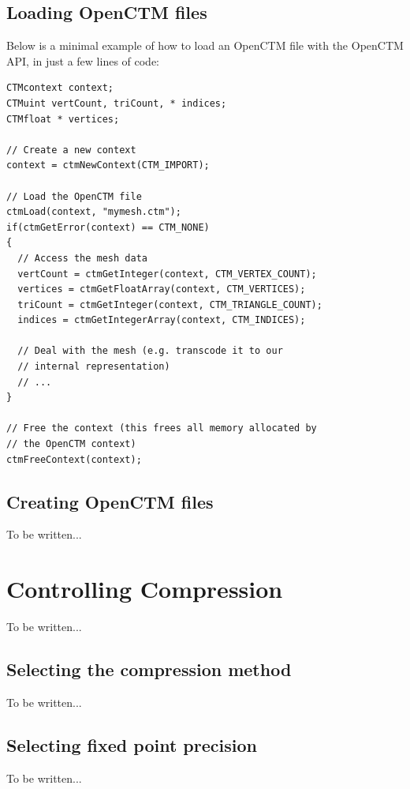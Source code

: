 \section{Loading OpenCTM files}
Below is a minimal example of how to load an OpenCTM file with the OpenCTM API,
in just a few lines of code:

\begin{lstlisting}
CTMcontext context;
CTMuint vertCount, triCount, * indices;
CTMfloat * vertices;

// Create a new context
context = ctmNewContext(CTM_IMPORT);

// Load the OpenCTM file
ctmLoad(context, "mymesh.ctm");
if(ctmGetError(context) == CTM_NONE)
{
  // Access the mesh data
  vertCount = ctmGetInteger(context, CTM_VERTEX_COUNT);
  vertices = ctmGetFloatArray(context, CTM_VERTICES);
  triCount = ctmGetInteger(context, CTM_TRIANGLE_COUNT);
  indices = ctmGetIntegerArray(context, CTM_INDICES);

  // Deal with the mesh (e.g. transcode it to our
  // internal representation)
  // ...
}

// Free the context (this frees all memory allocated by
// the OpenCTM context)
ctmFreeContext(context);
\end{lstlisting}


\section{Creating OpenCTM files}
To be written...




\chapter{Controlling Compression}
To be written...


\section{Selecting the compression method}
To be written...


\section{Selecting fixed point precision}
To be written...




